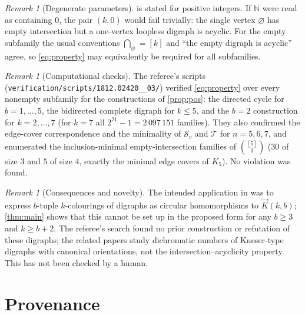 \documentclass[11pt,a4paper]{article}
\theoremstyle{plain}
\theoremstyle{definition}
\theoremstyle{remark}
\newtheorem{remark}[theorem]{Remark}
\newcommand{\dK}{\vec{K}}
\newcommand{\cS}{\mathcal S}
\newcommand{\cT}{\mathcal T}
\newcommand{\N}{\mathbb N}
\begin{document}
\begin{remark}[Degenerate parameters]
 is stated for positive integers. If $\N$ were read as containing $0$, the pair $(k,0)$ would fail trivially: the single vertex $\varnothing$ has empty intersection but a one-vertex loopless digraph is acyclic. For the empty subfamily the usual conventions $\bigcap_\varnothing=[k]$ and ``the empty digraph is acyclic'' agree, so \eqref{eq:property} may equivalently be required for all subfamilies.
\end{remark}

\begin{remark}[Computational checks]
The referee's scripts (\texttt{verification/scripts/1812.02420\_\_03/}) verified \eqref{eq:property} over every nonempty subfamily for the constructions of \cref{prop:pos}: the directed cycle for $b=1,\dots,5$, the bidirected complete digraph for $k\le5$, and the $b=2$ construction for $k=2,\dots,7$ (for $k=7$ all $2^{21}-1=2\,097\,151$ families). They also confirmed the edge-cover correspondence and the minimality of $\cS_v$ and $\cT$ for $n=5,6,7$, and enumerated the inclusion-minimal empty-intersection families of $\binom{[5]}{3}$ ($30$ of size $3$ and $5$ of size $4$, exactly the minimal edge covers of $K_5$). No violation was found.
\end{remark}

\begin{remark}[Consequences and novelty]
The intended application in \cite{HSS20} was to express $b$-tuple $k$-colourings of digraphs as circular homomorphisms to $\dK(k,b)$; \cref{thm:main} shows that this cannot be set up in the proposed form for any $b\ge3$ and $k\ge b+2$. The referee's search found no prior construction or refutation of these digraphs; the related papers \cite{Kneser23,Kneser25} study dichromatic numbers of Kneser-type digraphs with canonical orientations, not the intersection--acyclicity property. This has not been checked by a human.
\end{remark}

\section{Provenance}\label{sec:provenance}
\end{document}
